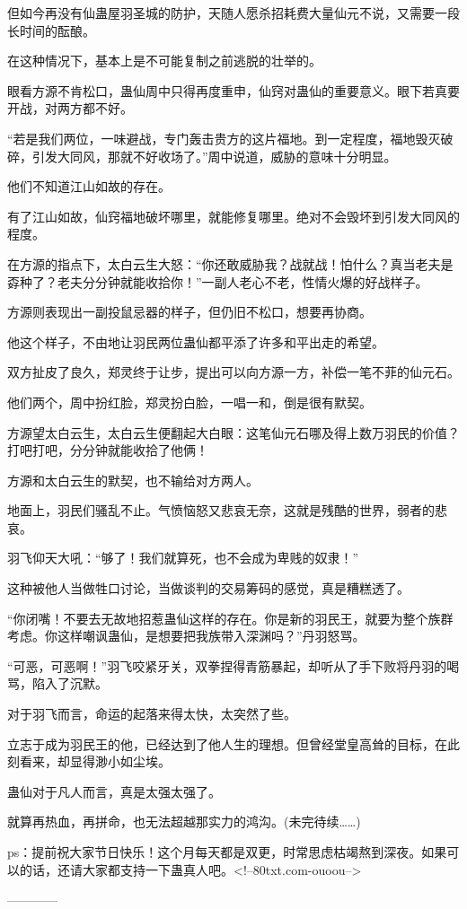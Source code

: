 \begin{this_body}
但如今再没有仙蛊屋羽圣城的防护，天随人愿杀招耗费大量仙元不说，又需要一段长时间的酝酿。

在这种情况下，基本上是不可能复制之前逃脱的壮举的。

眼看方源不肯松口，蛊仙周中只得再度重申，仙窍对蛊仙的重要意义。眼下若真要开战，对两方都不好。

“若是我们两位，一味避战，专门轰击贵方的这片福地。到一定程度，福地毁灭破碎，引发大同风，那就不好收场了。”周中说道，威胁的意味十分明显。

他们不知道江山如故的存在。

有了江山如故，仙窍福地破坏哪里，就能修复哪里。绝对不会毁坏到引发大同风的程度。

在方源的指点下，太白云生大怒：“你还敢威胁我？战就战！怕什么？真当老夫是孬种了？老夫分分钟就能收拾你！”一副人老心不老，性情火爆的好战样子。

方源则表现出一副投鼠忌器的样子，但仍旧不松口，想要再协商。

他这个样子，不由地让羽民两位蛊仙都平添了许多和平出走的希望。

双方扯皮了良久，郑灵终于让步，提出可以向方源一方，补偿一笔不菲的仙元石。

他们两个，周中扮红脸，郑灵扮白脸，一唱一和，倒是很有默契。

方源望太白云生，太白云生便翻起大白眼：这笔仙元石哪及得上数万羽民的价值？打吧打吧，分分钟就能收拾了他俩！

方源和太白云生的默契，也不输给对方两人。

地面上，羽民们骚乱不止。气愤恼怒又悲哀无奈，这就是残酷的世界，弱者的悲哀。

羽飞仰天大吼：“够了！我们就算死，也不会成为卑贱的奴隶！”

这种被他人当做牲口讨论，当做谈判的交易筹码的感觉，真是糟糕透了。

“你闭嘴！不要去无故地招惹蛊仙这样的存在。你是新的羽民王，就要为整个族群考虑。你这样嘲讽蛊仙，是想要把我族带入深渊吗？”丹羽怒骂。

“可恶，可恶啊！”羽飞咬紧牙关，双拳捏得青筋暴起，却听从了手下败将丹羽的喝骂，陷入了沉默。

对于羽飞而言，命运的起落来得太快，太突然了些。

立志于成为羽民王的他，已经达到了他人生的理想。但曾经堂皇高耸的目标，在此刻看来，却显得渺小如尘埃。

蛊仙对于凡人而言，真是太强太强了。

就算再热血，再拼命，也无法超越那实力的鸿沟。(未完待续……)

ps：提前祝大家节日快乐！这个月每天都是双更，时常思虑枯竭熬到深夜。如果可以的话，还请大家都支持一下蛊真人吧。<!--80txt.com-ouoou-->

------------

\end{this_body}

